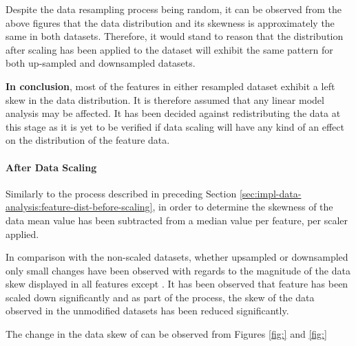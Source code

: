 Despite the data resampling process being random, it can be observed from the above figures that the data distribution and its skewness is approximately the same in both datasets. Therefore, it would stand to reason that the distribution after scaling has been applied to the dataset will exhibit the same pattern for both up-sampled and downsampled datasets.

\textbf{In conclusion}, most of the features in either resampled dataset exhibit a left skew in the data distribution. It is therefore assumed that any linear model analysis may be affected. It has been decided against redistributing the data at this stage as it is yet to be verified if data scaling will have any kind of an effect on the distribution of the feature data.
\FloatBarrier

\paragraph{After Data Scaling}\label{sec:impl-data-analysis:feature-dist-after-scaling}
Similarly to the process described in preceding Section \ref{sec:impl-data-analysis:feature-dist-before-scaling}, in order to determine the skewness of the data mean value has been subtracted from a median value per feature, per scaler applied. 

In comparison with the non-scaled datasets, whether upsampled or downsampled only small changes have been observed with regards to the magnitude of the data skew displayed in all features except \fileAgeInSec{}.
It has been observed that \fileAgeInSec{} feature has been scaled down significantly and as part of the process, the skew of the data observed in the unmodified datasets has been reduced significantly. 

The change in the data skew of \fileAgeInSec{} can be observed from Figures \ref{fig:} and \ref{fig:}

